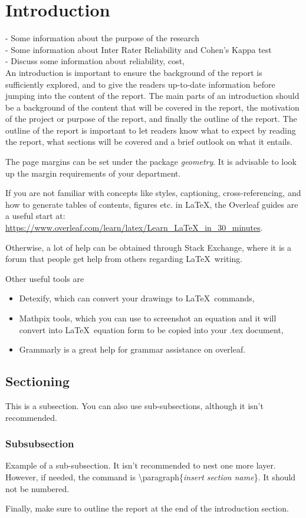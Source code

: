 \section{Introduction}
- Some information about the purpose of the research\\
- Some information about Inter Rater Reliability and Cohen's Kappa test\\
- Discuss some information about reliability, cost,\\[30pt]

An introduction is important to ensure the background of the report is sufficiently explored, and to give the readers up-to-date information before jumping into the content of the report. The main parts of an introduction should be a background of the content that will be covered in the report, the motivation of the project or purpose of the report, and finally the outline of the report. The outline of the report is important to let readers know what to expect by reading the report, what sections will be covered and a brief outlook on what it entails.

The page margins can be set under the package \textit{geometry}. It is advisable to look up the margin requirements of your department. 

If you are not familiar with concepts like styles, captioning, cross-referencing, and how to generate tables of contents, figures etc. in LaTeX, the Overleaf guides are a useful start at: \url{https://www.overleaf.com/learn/latex/Learn_LaTeX_in_30_minutes}. 

Otherwise, a lot of help can be obtained through Stack Exchange, where it is a forum that people get help from others regarding \LaTeX\ writing. 

Other useful tools are
\begin{itemize}
    \item Detexify, which can convert your drawings to \LaTeX\ commands, 
    \item Mathpix tools, which you can use to screenshot an equation and it will convert into \LaTeX\ equation form to be copied into your .tex document,
    \item Grammarly is a great help for grammar assistance on overleaf. 
\end{itemize}

\subsection{Sectioning}
This is a subsection. You can also use sub-subsections, although it isn't recommended.

\subsubsection{Subsubsection}
Example of a sub-subsection. It isn't recommended to nest one more layer. However, if needed, the command is \textbackslash paragraph\{\textit{insert section name}\}. It should not be numbered. 

\vspace{1em} 
Finally, make sure to outline the report at the end of the introduction section. 